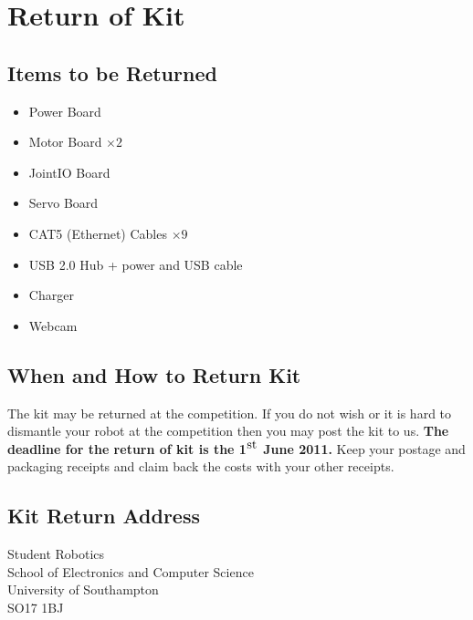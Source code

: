\section {Return of Kit}
\label{sec:kit-return}

\subsection {Items to be Returned}

\begin{itemize}
\item Power Board
\item Motor Board $\times 2$
\item JointIO Board
\item Servo Board
\item CAT5 (Ethernet) Cables $\times 9$
\item USB 2.0 Hub + power and USB cable
\item Charger
\item Webcam
\end{itemize}

\subsection {When and How to Return Kit}

The kit may be returned at the competition. If you do not wish or it is hard
to dismantle your robot at the competition then you may post the kit to us.
\textbf{The deadline for the return of kit is the 1$^{\hbox{st}}$ June 2011.}
Keep your postage and packaging receipts and claim back the costs with your
other receipts.

\subsection {Kit Return Address}

Student Robotics\\
School of Electronics and Computer Science\\
University of Southampton\\
SO17 1BJ
